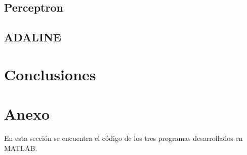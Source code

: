 \documentclass[12pt, titlepage]{article}
\begin{document}
        \subsection{Perceptron}
        \subsection{ADALINE}
    \section{Conclusiones}
    
    
    \section{Anexo}
        En esta sección se encuentra el código de los tres programas desarrollados en MATLAB.
\end{document}
